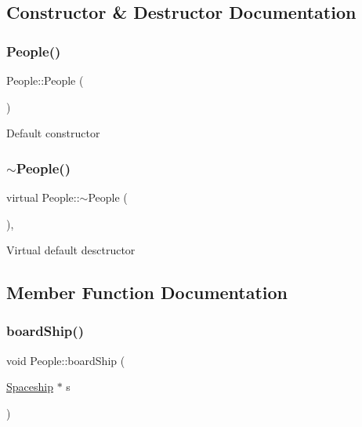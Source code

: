 \subsection{Constructor \& Destructor Documentation}
\mbox{\label{classPeople_aae1408eddfd15a5007003ecdf1507941}} 
\subsubsection{\texorpdfstring{People()}{People()}}
{\footnotesize\ttfamily People\+::\+People (\begin{DoxyParamCaption}{ }\end{DoxyParamCaption})\hspace{0.3cm}{\ttfamily [inline]}}

Default constructor \mbox{\label{classPeople_a26b0c041fafa38a1f84e0d51742e886a}} 
\subsubsection{\texorpdfstring{$\sim$\+People()}{~People()}}
{\footnotesize\ttfamily virtual People\+::$\sim$\+People (\begin{DoxyParamCaption}{ }\end{DoxyParamCaption})\hspace{0.3cm}{\ttfamily [inline]}, {\ttfamily [virtual]}}

Virtual default desctructor 

\subsection{Member Function Documentation}
\mbox{\label{classPeople_a66c99da939fe89614360953a3619a271}} 
\subsubsection{\texorpdfstring{board\+Ship()}{boardShip()}}
{\footnotesize\ttfamily void People\+::board\+Ship (\begin{DoxyParamCaption}\item[{\hyperlink{classSpaceship}{Spaceship} $\ast$}]{s }\end{DoxyParamCaption})}

